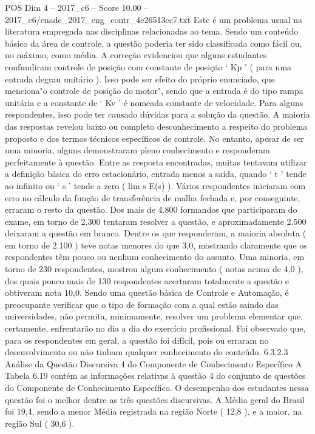 \begin{textsample}{POS Dim 4 – 2017\_c6 – Score 10.00 – 2017\_c6/enade\_2017\_eng\_contr\_4e26513cc7.txt}
Este é um problema usual na literatura empregada nas disciplinas relacionadas ao tema.
Sendo um conteúdo básico da área de controle, a questão poderia ter sido classificada como fácil ou, no máximo, como média.
A correção evidenciou que alguns estudantes confundiram controle de posição com constante de posição ‘ Kp ’ ( para uma entrada degrau unitário ).
Isso pode ser efeito do próprio enunciado, que menciona"o controle de posição do motor", sendo que a entrada é do tipo rampa unitária e a constante de ‘ Kv ’ é nomeada constante de velocidade.
Para alguns respondentes, isso pode ter causado dúvidas para a solução da questão.
A maioria das respostas revelou baixo ou completo desconhecimento a respeito do problema proposto e dos termos técnicos específicos de controle.
No entanto, apesar de ser uma minoria, alguns demonstraram pleno conhecimento e responderam perfeitamente à questão.
Entre as resposta encontradas, muitas tentavam utilizar a definição básica do erro estacionário, entrada menos a saída, quando ‘ t ’ tende ao infinito ou ‘ s ’ tende a zero ( lim s E(s) ).
Vários respondentes iniciaram com erro no cálculo da função de transferência de malha fechada e, por conseguinte, erraram o resto da questão.
Dos mais de 4.800 formandos que participaram do exame, em torno de 2.300 tentaram resolver a questão, e aproximadamente 2.500 deixaram a questão em branco.
Dentre os que responderam, a maioria absoluta ( em torno de 2.100 ) teve notas menores do que 3,0, mostrando claramente que os respondentes têm pouco ou nenhum conhecimento do assunto.
Uma minoria, em torno de 230 respondentes, mostrou algum conhecimento ( notas acima de 4,0 ), dos quais pouco mais de 130 respondentes acertaram totalmente a questão e obtiveram nota 10,0.
Sendo uma questão básica de Controle e Automação, é preocupante verificar que o tipo de formação com a qual estão saindo das universidades, não permita, minimamente, resolver um problema elementar que, certamente, enfrentarão no dia a dia do exercício profissional.
Foi observado que, para os respondentes em geral, a questão foi difícil, pois ou erraram no desenvolvimento ou não tinham qualquer conhecimento do conteúdo. 6.3.2.3 Análise da Questão Discursiva 4 do Componente de Conhecimento Específico A Tabela 6.19 contém as informações relativas à questão 4 do conjunto de questões do Componente de Conhecimento Específico.
O desempenho dos estudantes nessa questão foi o melhor dentre as três questões discursivas.
A Média geral do Brasil foi 19,4, sendo a menor Média registrada na região Norte ( 12,8 ), e a maior, na região Sul ( 30,6 ).

\end{textsample}
